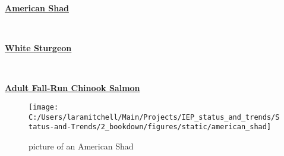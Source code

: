 \documentclass[
]{book}
\begin{document}
\begin{panel-grid}

\begin{columns-nocenter}

\begin{column800}

\textbf{\href{http://calfish.ucdavis.edu/species/?uid=3\&ds=698}{American Shad}}

\end{column800}

\begin{column40}

~

\end{column40}

\begin{column800}

\textbf{\href{http://calfish.ucdavis.edu/species/?uid=182\&ds=698}{White Sturgeon}}

\end{column800}

\begin{column40}

~

\end{column40}

\begin{column800}

\textbf{\href{http://calfish.ucdavis.edu/species/?uid=26\&ds=698}{Adult Fall-Run Chinook Salmon}}

\end{column800}

\end{columns-nocenter}

\begin{columns-nocenter}

\begin{column800}

\begin{figure}

{\centering \texttt{[image: C:/Users/laramitchell/Main/Projects/IEP\_status\_and\_trends/Status-and-Trends/2\_bookdown/figures/static/american\_shad]} 

}

\caption{picture of an American Shad}\label{fig:unnamed-chunk-127}
\end{figure}

\end{column800}

\begin{column40}


\end{column40}
\end{columns-nocenter}
\end{panel-grid}
\end{document}
